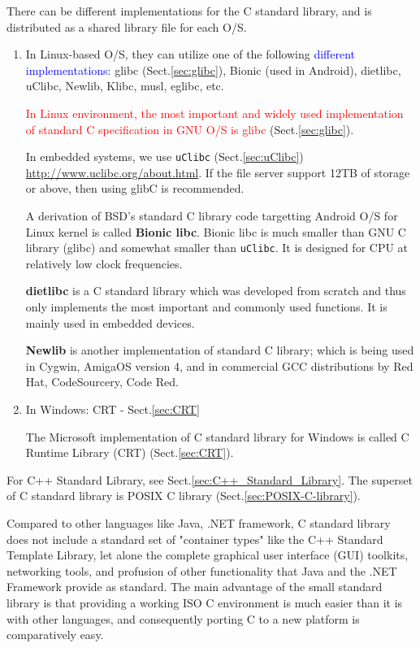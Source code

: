 There can be different implementations for the C standard library, and is
distributed as a shared library file for each O/S.
\begin{enumerate}

  \item In Linux-based O/S, they can utilize one of the following
\textcolor{blue}{different implementations}: glibc (Sect.\ref{sec:glibc}),
Bionic (used in Android), dietlibc, uClibc, Newlib, Klibc, musl, eglibc, etc.

\textcolor{red}{In Linux environment, the most important and widely used
implementation of standard C specification in GNU O/S is glibc}
(Sect.\ref{sec:glibc}).

In embedded systems, we use \verb!uClibc! (Sect.\ref{sec:uClibc})
\url{http://www.uclibc.org/about.html}. If the file server support 12TB of
storage or above, then using glibC is recommended.

A derivation of BSD's standard C library code targetting Android O/S for Linux
kernel is called  {\bf Bionic libc}. Bionic libc is much smaller than GNU C
library (glibc) and somewhat smaller than \verb!uClibc!. It is designed
for CPU at relatively low clock frequencies.

{\bf dietlibc} is a C standard library which was developed from scratch and thus
only implements the most important and commonly used functions. It is mainly
used in embedded devices. 

{\bf Newlib} is another implementation of standard C library; which is being
used in Cygwin, AmigaOS version 4, and in commercial GCC distributions by Red
Hat, CodeSourcery, Code Red. 

  
  \item In Windows: CRT - Sect.\ref{sec:CRT}

The Microsoft implementation of C standard library for  Windows is called C
Runtime Library (CRT) (Sect.\ref{sec:CRT}).

\end{enumerate}




\begin{mdframed}
For C++ Standard Library, see Sect.\ref{sec:C++_Standard_Library}.
The superset of C standard library is POSIX C library
(Sect.\ref{sec:POSIX-C-library}). 

Compared to other languages like Java, .NET framework, C standard library does
not include a standard set of "container types" like the C++ Standard Template
Library, let alone the complete graphical user interface (GUI) toolkits,
networking tools, and profusion of other functionality that Java and the .NET
Framework provide as standard. The main advantage of the small standard library
is that providing a working ISO C environment is much easier than it is with
other languages, and consequently porting C to a new platform is comparatively
easy.


\end{mdframed}

